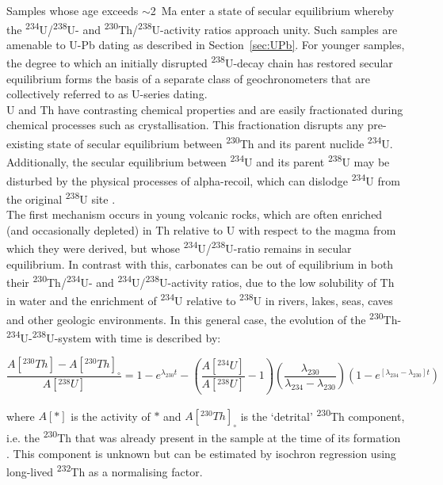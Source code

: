 \documentclass{article}
\begin{document}
Samples whose age exceeds $\sim$2~Ma enter a state of secular
equilibrium whereby the \textsuperscript{234}U/\textsuperscript{238}U-
and \textsuperscript{230}Th/\textsuperscript{238}U-activity ratios
approach unity. Such samples are amenable to U-Pb dating as described
in Section~\ref{sec:UPb}. For younger samples, the degree to which an
initially disrupted \textsuperscript{238}U-decay chain has restored
secular equilibrium forms the basis of a separate class of
geochronometers that are collectively referred to as U-series
dating.\\

U and Th have contrasting chemical properties and are easily
fractionated during chemical processes such as crystallisation. This
fractionation disrupts any pre-existing state of secular equilibrium
between \textsuperscript{230}Th and its parent nuclide
\textsuperscript{234}U. Additionally, the secular equilibrium between
\textsuperscript{234}U and its parent \textsuperscript{238}U may be
disturbed by the physical processes of alpha-recoil, which can
dislodge \textsuperscript{234}U from the original
\textsuperscript{238}U site \citep{moore1967}.\\

The first mechanism occurs in young volcanic rocks, which are often
enriched (and occasionally depleted) in Th relative to U with respect
to the magma from which they were derived, but whose
\textsuperscript{234}U/\textsuperscript{238}U-ratio remains in secular
equilibrium. In contrast with this, carbonates can be out of
equilibrium in both their
\textsuperscript{230}Th/\textsuperscript{234}U- and
\textsuperscript{234}U/\textsuperscript{238}U-activity ratios, due to
the low solubility of Th in water and the enrichment of
\textsuperscript{234}U relative to \textsuperscript{238}U in rivers,
lakes, seas, caves and other geologic environments. In this general
case, the evolution of the
\textsuperscript{230}Th-\textsuperscript{234}U-\textsuperscript{238}U-system
with time is described by:

\begin{equation}
  \frac{A[{}^{230}Th] - A[{}^{230}Th]_\circ}{A[{}^{238}U]} =
  1 - e^{\lambda_{230}t} -
  \left(\frac{A[{}^{234}U]}{A[{}^{238}U]}-1\right)
  \left(\frac{\lambda_{230}}{\lambda_{234}-\lambda_{230}}\right)
  \left(1-e^{[\lambda_{234}-\lambda_{230}]t}\right)
  \label{eq:Th-U}
\end{equation}

\noindent where $A[\ast]$ is the activity of $\ast$ and
$A[{}^{230}Th]_\circ$ is the `detrital' \textsuperscript{230}Th
component, i.e. the \textsuperscript{230}Th that was already present
in the sample at the time of its formation \citep{kaufman1965,
  ludwig2003b}. This component is unknown but can be estimated by
isochron regression using long-lived \textsuperscript{232}Th as a
normalising factor.\\
\end{document}

